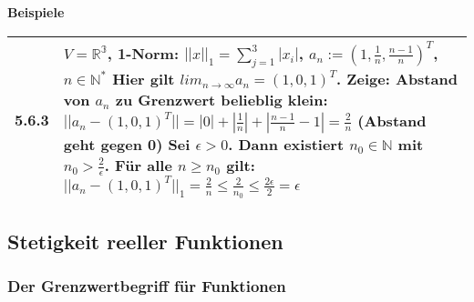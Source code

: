 \noindent
\textbf{Beispiele}
\begin{table}[h]
\begin{tabularx}{\textwidth}{X m{16cm}}
    \toprule

    5.6.3 & $V = \mathbb{R^3}$, 1-Norm: $||x||_1 = \sum^3_{j=1} |x_i|$, $a_n := (1, \frac{1}{n}, \frac{n-1}{n})^T$, $n \in \mathbb{N^*}$ \hfill \break
            Hier gilt $lim_{n \rightarrow \infty} a_n = (1,0,1)^T$. Zeige: Abstand von $a_n$ zu Grenzwert belieblig klein: \hfill \break
            $||a_n - (1,0,1)^T|| = |0| + |\frac{1}{n}| + |\frac{n-1}{n}-1| = \frac{2}{n}$ (Abstand geht gegen 0) \hfill \break
            Sei $\epsilon > 0$. Dann existiert $n_0 \in \mathbb{N}$ mit $n_0 > \frac{2}{\epsilon}$. Für alle $n \geq n_0$ gilt: \hfill \break
            $||a_n - (1,0,1)^T||_1 = \frac{2}{n} \leq \frac{2}{n_0} \leq \frac{2\epsilon}{2} = \epsilon$ \\

    \bottomrule
\end{tabularx}
\end{table}

\subsection{Stetigkeit reeller Funktionen}
\subsubsection{Der Grenzwertbegriff für Funktionen}


